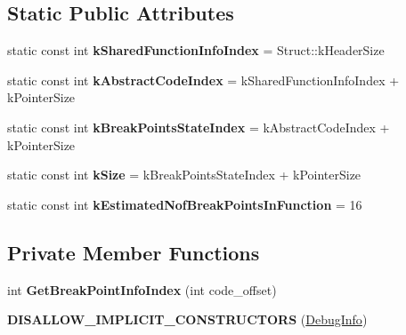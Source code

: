 \subsection*{Static Public Attributes}
\begin{DoxyCompactItemize}
\item 
static const int {\bfseries k\+Shared\+Function\+Info\+Index} = Struct\+::k\+Header\+Size\hypertarget{classv8_1_1internal_1_1_debug_info_ac18e2f70bcdf450c4755ec31e64e1c2a}{}\label{classv8_1_1internal_1_1_debug_info_ac18e2f70bcdf450c4755ec31e64e1c2a}

\item 
static const int {\bfseries k\+Abstract\+Code\+Index} = k\+Shared\+Function\+Info\+Index + k\+Pointer\+Size\hypertarget{classv8_1_1internal_1_1_debug_info_a6bade4dde2864968044bcf65ef65beee}{}\label{classv8_1_1internal_1_1_debug_info_a6bade4dde2864968044bcf65ef65beee}

\item 
static const int {\bfseries k\+Break\+Points\+State\+Index} = k\+Abstract\+Code\+Index + k\+Pointer\+Size\hypertarget{classv8_1_1internal_1_1_debug_info_a52dd29dcab3707ffd1fbbbc979d76cd3}{}\label{classv8_1_1internal_1_1_debug_info_a52dd29dcab3707ffd1fbbbc979d76cd3}

\item 
static const int {\bfseries k\+Size} = k\+Break\+Points\+State\+Index + k\+Pointer\+Size\hypertarget{classv8_1_1internal_1_1_debug_info_a1c7cf51674bd009e80b4e9fbd7e53cd3}{}\label{classv8_1_1internal_1_1_debug_info_a1c7cf51674bd009e80b4e9fbd7e53cd3}

\item 
static const int {\bfseries k\+Estimated\+Nof\+Break\+Points\+In\+Function} = 16\hypertarget{classv8_1_1internal_1_1_debug_info_a0b1600830cc1002be957fe793f3cf28c}{}\label{classv8_1_1internal_1_1_debug_info_a0b1600830cc1002be957fe793f3cf28c}

\end{DoxyCompactItemize}
\subsection*{Private Member Functions}
\begin{DoxyCompactItemize}
\item 
int {\bfseries Get\+Break\+Point\+Info\+Index} (int code\+\_\+offset)\hypertarget{classv8_1_1internal_1_1_debug_info_a3a09528effd8444a4689b608aad25560}{}\label{classv8_1_1internal_1_1_debug_info_a3a09528effd8444a4689b608aad25560}

\item 
{\bfseries D\+I\+S\+A\+L\+L\+O\+W\+\_\+\+I\+M\+P\+L\+I\+C\+I\+T\+\_\+\+C\+O\+N\+S\+T\+R\+U\+C\+T\+O\+RS} (\hyperlink{classv8_1_1internal_1_1_debug_info}{Debug\+Info})\hypertarget{classv8_1_1internal_1_1_debug_info_ac3c50eb2bd63d6588bc76e34a7051599}{}\label{classv8_1_1internal_1_1_debug_info_ac3c50eb2bd63d6588bc76e34a7051599}

\end{DoxyCompactItemize}
